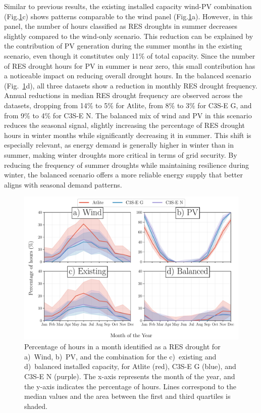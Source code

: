 \documentclass[a4paper, 11pt]{article}
\begin{document}
Similar to previous results, the existing installed capacity wind-PV combination (Fig.\ref{fig:res_droughts_seasonality}c) shows patterns comparable to the wind panel (Fig.\ref{fig:res_droughts_seasonality}a). However, in this panel, the number of hours classified as RES droughts in summer decreases slightly compared to the wind-only scenario. This reduction can be explained by the contribution of PV generation during the summer months in the existing scenario, even though it constitutes only 11\% of total capacity. Since the number of RES drought hours for PV in summer is near zero, this small contribution has a noticeable impact on reducing overall drought hours. In the balanced scenario (Fig.~\ref{fig:res_droughts_seasonality}d), all three datasets show a reduction in monthly RES drought frequency. Annual reductions in median RES drought frequency are observed across the datasets, dropping from 14\% to 5\% for Atlite, from 8\% to 3\% for C3S-E G, and from 9\% to 4\% for C3S-E N. The balanced mix of wind and PV in this scenario reduces the seasonal signal, slightly increasing the percentage of RES drought hours in winter months while significantly decreasing it in summer. This shift is especially relevant, as energy demand is generally higher in winter than in summer, making winter droughts more critical in terms of grid security. By reducing the frequency of summer droughts while maintaining resilience during winter, the balanced scenario offers a more reliable energy supply that better aligns with seasonal demand patterns.

\begin{figure}[!ht]
	\centering
	\includegraphics[width=\textwidth]{droughts_seasonality}
	\caption{Percentage of hours in a month identified as a RES drought for a)~Wind, b)~PV, and the combination for the c)~existing and d)~balanced installed capacity, for Atlite (red), C3S-E G (blue), and C3S-E N (purple). The x-axis represents the month of the year, and the y-axis indicates the percentage of hours. Lines correspond to the median values and the area between the first and third quartiles is shaded.}
	\label{fig:res_droughts_seasonality}
\end{figure}
\end{document}
